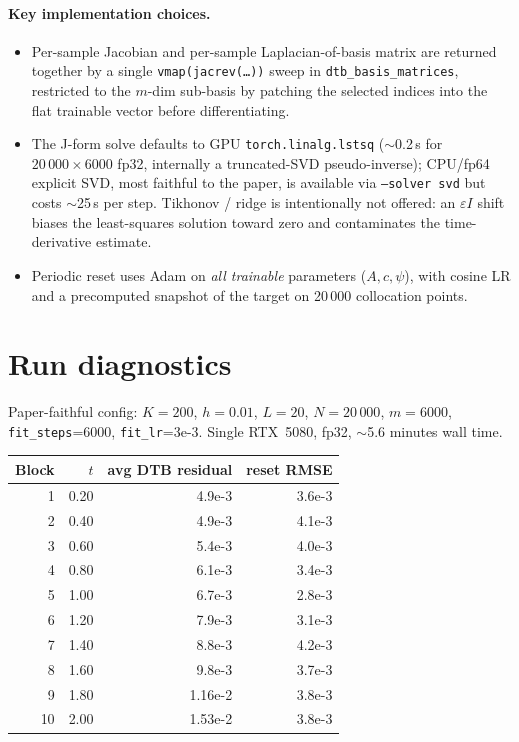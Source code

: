 \documentclass[11pt]{article}
\newcommand{\code}[1]{\texttt{\small #1}}
\begin{document}
\paragraph{Key implementation choices.}
\begin{itemize}\itemsep0pt
  \item Per-sample Jacobian and per-sample Laplacian-of-basis matrix
        are returned together by a single
        \code{vmap(jacrev(\dots))} sweep in \code{dtb\_basis\_matrices},
        restricted to the $m$-dim sub-basis by patching the selected
        indices into the flat trainable vector before differentiating.
  \item The J-form solve defaults to GPU \code{torch.linalg.lstsq}
        ($\sim$0.2\,s for $20\,000\times 6000$ fp32, internally a
        truncated-SVD pseudo-inverse); CPU/fp64 explicit SVD,
        most faithful to the paper, is available via \code{--solver svd}
        but costs $\sim$25\,s per step. Tikhonov / ridge is
        intentionally not offered: an $\varepsilon I$ shift biases the
        least-squares solution toward zero and contaminates the
        time-derivative estimate.
  \item Periodic reset uses Adam on \emph{all trainable} parameters
        ($A,c,\psi$), with cosine LR and a precomputed snapshot of
        the target on 20\,000 collocation points.
\end{itemize}

\section{Run diagnostics}

Paper-faithful config: $K=200$, $h=0.01$, $L=20$, $N=20\,000$,
$m=6000$, \code{fit\_steps}=6000, \code{fit\_lr}=3e-3. Single RTX~5080,
fp32, $\sim$5.6 minutes wall time.

\begin{center}
\begin{tabular}{rrrr}
  \toprule
  Block & $t$ & avg DTB residual & reset RMSE \\
  \midrule
   1 & 0.20 & 4.9e-3 & 3.6e-3 \\
   2 & 0.40 & 4.9e-3 & 4.1e-3 \\
   3 & 0.60 & 5.4e-3 & 4.0e-3 \\
   4 & 0.80 & 6.1e-3 & 3.4e-3 \\
   5 & 1.00 & 6.7e-3 & 2.8e-3 \\
   6 & 1.20 & 7.9e-3 & 3.1e-3 \\
   7 & 1.40 & 8.8e-3 & 4.2e-3 \\
   8 & 1.60 & 9.8e-3 & 3.7e-3 \\
   9 & 1.80 & 1.16e-2 & 3.8e-3 \\
  10 & 2.00 & 1.53e-2 & 3.8e-3 \\
  \bottomrule
\end{tabular}
\end{center}
\end{document}

